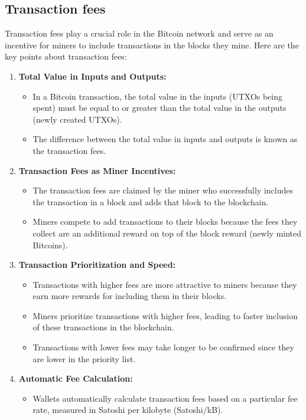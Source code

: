 \documentclass{report}
\begin{document}
\subsection{Transaction fees}
	Transaction fees play a crucial role in the Bitcoin network and serve as an incentive for miners to include transactions in the blocks they mine. Here are the key points about transaction fees:
\begin{enumerate}
	\item \textbf{Total Value in Inputs and Outputs:} 
	\begin{itemize}
		\item In a Bitcoin transaction, the total value in the inputs (UTXOs being spent) must be equal to or greater than the total value in the outputs (newly created UTXOs).
		\item The difference between the total value in inputs and outputs is known as the transaction fees.
	\end{itemize}
	\item \textbf{Transaction Fees as Miner Incentives:}
	\begin{itemize}
		\item The transaction fees are claimed by the miner who successfully includes the transaction in a block and adds that block to the blockchain.
		\item Miners compete to add transactions to their blocks because the fees they collect are an additional reward on top of the block reward (newly minted Bitcoins).
	\end{itemize}
	\item \textbf{Transaction Prioritization and Speed:}
	\begin{itemize}
		\item Transactions with higher fees are more attractive to miners because they earn more rewards for including them in their blocks.
		\item Miners prioritize transactions with higher fees, leading to faster inclusion of these transactions in the blockchain.
		\item Transactions with lower fees may take longer to be confirmed since they are lower in the priority list.
	\end{itemize}
	\item \textbf{Automatic Fee Calculation:}
	\begin{itemize}
		\item Wallets automatically calculate transaction fees based on a particular fee rate, measured in Satoshi per kilobyte (Satoshi/kB).

\end{itemize}
\end{enumerate}
\end{document}
